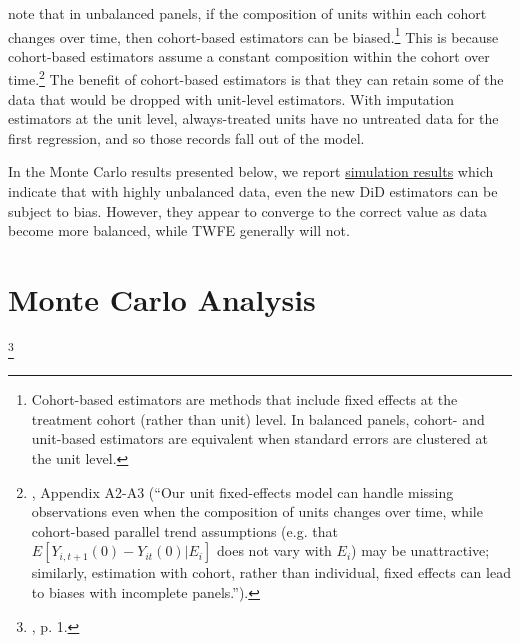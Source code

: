 \documentclass[12pt]{article}
\begin{document}
\citet{borusyak2024revisiting} note that in unbalanced panels, if the composition of units within each cohort changes over time, then cohort-based estimators can be biased.\footnote{Cohort-based estimators are methods that include fixed effects at the treatment cohort (rather than unit) level. In balanced panels, cohort- and unit-based estimators are equivalent when standard errors are clustered at the unit level.}  This is because cohort-based estimators assume a constant composition within the cohort over time.\footnote{\citet{borusyak2024revisiting}, Appendix A2-A3 (“Our unit fixed-effects model can handle missing observations even when the composition of units changes over time, while cohort-based parallel trend assumptions (e.g. that $E[Y_{i,t+1}(0) - Y_{it}(0) | E_i]$ does not vary with $E_i$) may be unattractive; similarly, estimation with cohort, rather than individual, fixed effects can lead to biases with incomplete panels.”).}  The benefit of cohort-based estimators is that they can retain some of the data that would be dropped with unit-level estimators. With imputation estimators at the unit level, always-treated units have no untreated data for the first regression, and so those records fall out of the model.

In the Monte Carlo results presented below, we report \hyperref[fig:estimators-balanced]{simulation results} which indicate that with highly unbalanced data, even the new DiD estimators can be subject to bias. However, they appear to converge to the correct value as data become more balanced, while TWFE generally will not.

\section{Monte Carlo Analysis} \label{sec:analysis}
\begin{singlespace*}
\footnote{\citet{gardner2022a}, p. 1.}\end{singlespace*}
\end{document}

